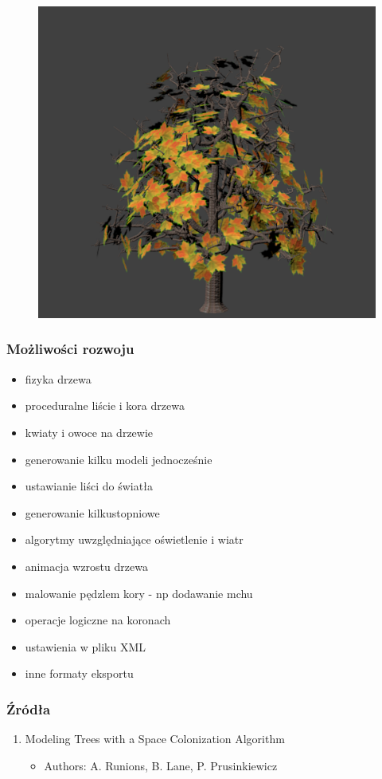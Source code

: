 \documentclass[blue,table]{beamer}
\begin{document}
\begin{frame}
\begin{multicols}{3}
\begin{figure}
\end{figure}
\begin{figure}
\includegraphics[scale=0.25]{img/blender/blender18.png} 
\end{figure}
\end{multicols}
\end{frame}

\begin{frame}\frametitle{Możliwości rozwoju}
\begin{itemize}
\item fizyka drzewa
\item proceduralne liście i kora drzewa
\item kwiaty i owoce na drzewie
\item generowanie kilku modeli jednocześnie
\item ustawianie liści do światła
\item generowanie kilkustopniowe
\item algorytmy uwzględniające oświetlenie i wiatr
\item animacja wzrostu drzewa
\item malowanie pędzlem kory - np dodawanie mchu
\item operacje logiczne na koronach
\item ustawienia w pliku XML
\item inne formaty eksportu
\end{itemize}
\end{frame}


\begin{frame}\frametitle{Źródła}
\begin{enumerate}
\item{Modeling Trees with a Space Colonization Algorithm}
\begin{itemize}
\item{Authors: A. Runions, B. Lane, P. Prusinkiewicz}
\end{itemize}
\end{enumerate}
\end{frame}
\end{document}
